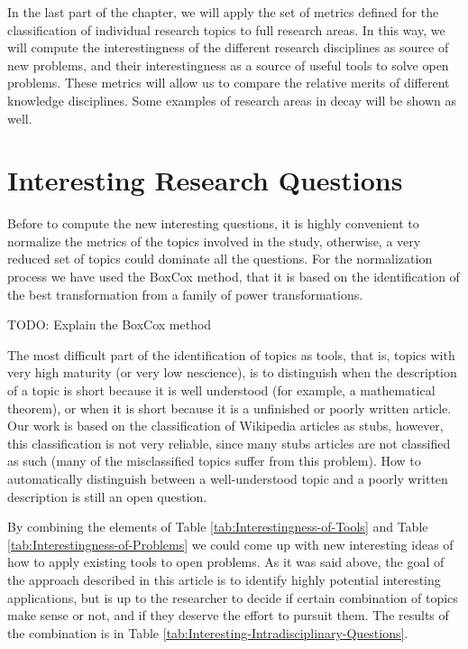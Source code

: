 In the last part of the chapter, we will apply the set of metrics defined for the classification of individual research topics to full research areas. In this way, we will compute the interestingness of the different research disciplines as source of new problems, and their interestingness as a source of useful tools to solve open problems. These metrics will allow us to compare the relative merits of different knowledge disciplines. Some examples of research areas in decay will be shown as well.


\section{Interesting Research Questions}

Before to compute the new interesting questions, it is highly convenient to normalize the metrics of the topics involved in the study, otherwise, a very reduced set of topics could dominate all the questions. For the normalization process we have used the BoxCox method, that it is based on the identification of the best transformation from a family of power transformations.

{\color{red} TODO: Explain the BoxCox method} 

The most difficult part of the identification of topics as tools, that is, topics with very high maturity (or very low nescience), is to distinguish when the description of a topic is short because it is well understood (for example, a mathematical theorem), or when it is short because it is a unfinished or poorly written article. Our work is based on the classification of Wikipedia articles as stubs, however, this classification is not very reliable, since many stubs articles are not classified as such (many of the misclassified topics suffer from this problem). How to automatically distinguish between a well-understood topic and a poorly written description is still an open question.

By combining the elements of Table \ref{tab:Interestingness-of-Tools}
and Table \ref{tab:Interestingness-of-Problems} we could come up
with new interesting ideas of how to apply existing tools to open
problems. As it was said above, the goal of the approach described
in this article is to identify highly potential interesting applications,
but is up to the researcher to decide if certain combination of topics
make sense or not, and if they deserve the effort to pursuit them.
The results of the combination is in Table \ref{tab:Interesting-Intradisciplinary-Questions}.

